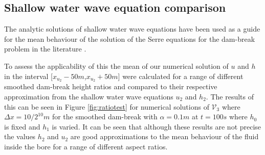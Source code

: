 \documentclass[times]{elsarticle}
\begin{document}
\subsection{Shallow water wave equation comparison}
The analytic solutions of shallow water wave equations have been used as a guide for the mean behaviour of the solution of the Serre equations for the dam-break problem in the literature \cite{Hank-etal-2010-2034,Mitsotakis-etal-2014}. 

To assess the applicability of this the mean of our numerical solution of $u$ and $h$ in the interval [$x_{u_2}-50m$,$x_{u_2}+50m$] were calculated for a range of different smoothed dam-break height ratios and compared to their respective approximation from the shallow water wave equations $u_2$ and $h_2$. The results of this can be seen in Figure \ref{fig:ratiotest} for numerical solutions of $\mathcal{V}_3$ where $\Delta x = 10/2^{10}m$ for the smoothed dam-break with $\alpha=0.1m$ at $t=100s$ where $h_0$ is fixed and $h_1$ is varied. It can be seen that although these results are not precise the values $h_2$ and $u_2$ are good approximations to the mean behaviour of the fluid inside the bore for a range of different aspect ratios.
 
\end{document}
